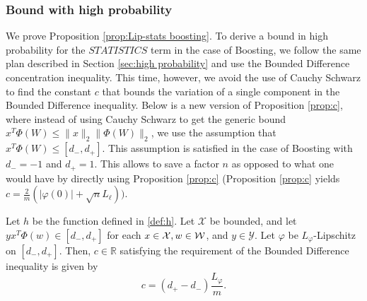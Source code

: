 \subsubsection{Bound with high probability}
We prove Proposition \ref{prop:Lip-stats boosting}. To derive a bound in high probability for the $STATISTICS$ term in the case of Boosting, we follow the same plan described in Section \ref{sec:high probability} and use the Bounded Difference concentration inequality. This time, however, we avoid the use of Cauchy Schwarz to find the constant $c$ that bounds the variation of a single component in the Bounded Difference inequality. Below is a new version of Proposition \ref{prop:c}, where instead of using Cauchy Schwarz to get the generic bound $x^T\Phi(W) \le \|x\|_2\|\Phi(W)\|_2$, we use the assumption that $x^T\Phi(W) \le [d_-,d_+]$. This assumption is satisfied in the case of Boosting with $d_-=-1$ and $d_+=1$. This allows to save a factor $n$ as opposed to what one would have by directly using Proposition \ref{prop:c} (Proposition \ref{prop:c} yields $c = \frac{2}{m} (|\varphi(0)| + \sqrt{n}L_\ell ))$.

\begin{proposition}
\label{prop:cBoosting}
Let $h$ be the function defined in \eqref{def:h}.
Let $\mathcal{X}$ be bounded, and let $yx^T\Phi(w) \in [d_-,d_+]$ for each $x\in\mathcal{X},w\in\mathcal{W}$, and $y\in \mathcal{Y}$. Let $\varphi$ be $L_\varphi$-Lipschitz on $[d_-,d_+]$. Then, $c\in\mathbb{R}$ satisfying the requirement of the Bounded Difference inequality is given by
$$
	c = (d_+-d_-)\frac{L_{\varphi}}{m}.
$$
\end{proposition}

